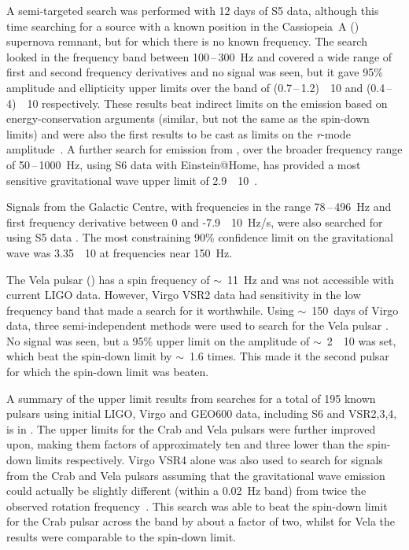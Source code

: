 A semi-targeted search was performed with 12 days of S5 data, although this time searching for a source with 
a known position in the Cassiopeia~A () supernova remnant, but for which there is no 
known frequency. The search~\cite{Abadie:2010g} looked in the frequency band between 100\,--\,300~Hz and 
covered a wide range of first and second frequency derivatives and no signal was seen, but it gave 95\% 
amplitude and ellipticity upper limits over the band of (0.7\,--\,1.2)~\texttimes~10 and
(0.4\,--\,4)~\texttimes~10 respectively. These results beat indirect limits on the emission based 
on energy-conservation arguments (similar, but not the same as the spin-down limits) and were also the
first results to be cast as limits on the \textit{r}-mode amplitude~\cite{Owen:2010}. A further search for 
emission from , over the broader frequency range of 50\,--\,1000~Hz, using S6 data with
Einstein@Home, has provided a most sensitive gravitational wave upper limit of 
2.9~\texttimes~10~\cite{2016arXiv160807589Z}.

Signals from the Galactic Centre, with frequencies in the range 78\,--\,496~Hz and first frequency derivative 
between 0 and -7.9~\texttimes~10~Hz/s, were also searched for using S5 data 
\cite{2013PhRvD..88j2002A}. The most constraining 90\% confidence limit on the gravitational wave was 
3.35~\texttimes~10 at frequencies near 150~Hz.

The Vela pulsar () has a spin frequency of $\sim$~11~Hz and was not accessible 
with current LIGO data.  However, Virgo VSR2 data had sensitivity in the low frequency band that made a search 
for it worthwhile. Using $\sim$~150~days of Virgo data, three semi-independent methods were used to search 
for the Vela pulsar \cite{Abadie:2011b}. No signal was seen, but a 95\% upper limit on the amplitude of 
$\sim$~2~\texttimes~10 was set, which beat the spin-down limit by $\sim$~1.6 times. This made it 
the second pulsar for which the spin-down limit was beaten.

A summary of the upper limit results from searches for a total of 195 known pulsars using initial LIGO, Virgo 
and GEO600 data, including S6 and VSR2,3,4, is in \cite{2014ApJ...785..119A}. The upper limits for the Crab 
and Vela pulsars were further improved upon, making them factors of approximately ten and three lower than 
the spin-down limits respectively. Virgo VSR4 alone was also used to search for signals from the Crab and 
Vela pulsars assuming that the gravitational wave emission could actually be slightly different (within a 
0.02~Hz band) from twice the observed rotation frequency~\cite{2015PhRvD..91b2004A}. This search was able to 
beat the spin-down limit for the Crab pulsar across the band by about a factor of two, whilst for Vela the 
results were comparable to the spin-down limit.

